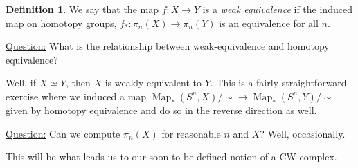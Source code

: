 \documentclass[leqno, openany]{memoir}
\theoremstyle{definition}
\newtheorem{defn}[thm]{Definition}
\theoremstyle{remark}
\theoremstyle{plain}
\theoremstyle{definition}
\theoremstyle{remark}
\DeclareMathOperator{\Map}{Map}
\begin{document}
\begin{defn}
    We say that the map $f: X \to Y$ is a \emph{weak equivalence} if the induced map on homotopy groups, $f_\ast: \pi_n(X) \to \pi_n(Y)$ is an equivalence for all $n$.
\end{defn}

\underline{Question:} What is the relationship between weak-equivalence and homotopy equivalence? 
\par
Well, if $X \simeq Y$, then $X$ is weakly equivalent to $Y$. This is a fairly-straightforward exercise where we induced a map $\Map_\ast(S^n,X)/\sim \to \Map_\ast(S^n, Y)/\sim$ given by homotopy equivalence and do so in the reverse direction as well. 
\\
\par 
\underline{Question:} Can we compute $\pi_n(X)$ for reasonable $n$ and $X$? Well, occasionally. 

This will be what leads us to our soon-to-be-defined notion of a CW-complex. 
\end{document}
